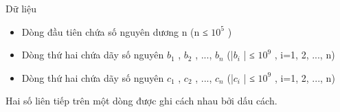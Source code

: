Dữ liệu
\begin{itemize}
	\item Dòng đầu tiên chứa số nguyên dương n (n ≤ $10^{5}$ )
	\item Dòng thứ hai chứa dãy số nguyên $b_{1}$ , $b_{2}$ , ..., $b_{n}$ (|$b_{i}$ | ≤ $10^{9}$ , i=1, 2, ..., n)
	\item Dòng thứ hai chứa dãy số nguyên $c_{1}$ , $c_{2}$ , ..., $c_{n}$ (|$c_{i}$ | ≤ $10^{9}$ , i=1, 2, ..., n)
\end{itemize}

Hai số liên tiếp trên một dòng được ghi cách nhau bởi dấu cách.